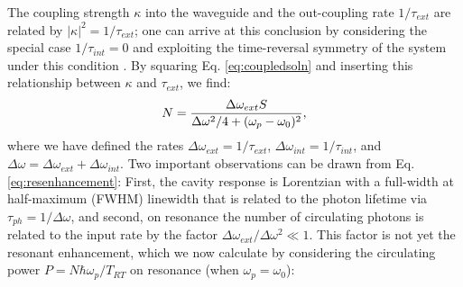 The coupling strength $\kappa$ into the waveguide and the out-coupling rate $1/\tau_{ext}$ are related by $|\kappa|^2=1/\tau_{ext}$; one can arrive at this conclusion by considering the special case $1/\tau_{int}=0$ and exploiting the time-reversal symmetry of the system under this condition \cite{Haus1984}. By squaring Eq. \ref{eq:coupledsoln} and inserting this relationship between $\kappa$ and $\tau_{ext}$, we find:
% 
   \begin{equation}
   N=\frac{\Delta\omega_{ext}S}{\Delta\omega^2/4+(\omega_{p}-\omega_0)^2}, \label{eq:resenhancement}
   \end{equation}
   where we have defined the rates $\Delta\omega_{ext}=1/\tau_{ext}$, $\Delta\omega_{int}=1/\tau_{int}$, and $\Delta\omega=\Delta\omega_{ext}+\Delta\omega_{int}$. Two important observations can be drawn from Eq. \ref{eq:resenhancement}: First, the cavity response is Lorentzian with a full-width at half-maximum (FWHM) linewidth that is related to the photon lifetime via $\tau_{ph}=1/\Delta\omega$, and second, on resonance the number of circulating photons is related to the input rate by the factor $\Delta\omega_{ext}/\Delta\omega^2\ll1$. This factor is not yet the resonant enhancement, which we now calculate by considering the circulating power $P=N\hbar\omega_p/T_{RT}$ on resonance (when $\omega_p=\omega_0$):
